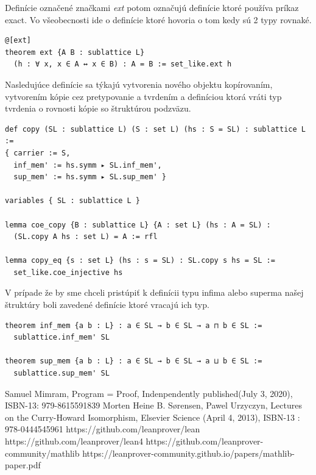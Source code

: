 \documentclass[a4paper,10pt,oneside]{report}%
\begin{document}
    Definície označené značkami \emph{ext} potom označujú definície ktoré
používa príkaz exact. Vo všeobecnosti ide o definície ktoré hovoria o tom
kedy sú 2 typy rovnaké.
\begin{lstlisting}
@[ext]
theorem ext {A B : sublattice L}
  (h : ∀ x, x ∈ A ↔ x ∈ B) : A = B := set_like.ext h
\end{lstlisting}
    Nasledujúce definície sa týkajú vytvorenia nového objektu kopírovaním,
vytvorením kópie cez pretypovanie a tvrdením a definíciou ktorá vráti typ
tvrdenia o rovnosti kópie so štruktúrou podzväzu.
\begin{lstlisting}
def copy (SL : sublattice L) (S : set L) (hs : S = SL) : sublattice L :=
{ carrier := S,
  inf_mem' := hs.symm ▸ SL.inf_mem',
  sup_mem' := hs.symm ▸ SL.sup_mem' }

variables { SL : sublattice L }

lemma coe_copy {B : sublattice L} {A : set L} (hs : A = SL) :
  (SL.copy A hs : set L) = A := rfl

lemma copy_eq {s : set L} (hs : s = SL) : SL.copy s hs = SL :=
  set_like.coe_injective hs
\end{lstlisting}
    V prípade že by sme chceli pristúpiť k definícii typu infima alebo superma
našej štruktúry boli zavedené definície ktoré vracajú ich typ.
\begin{lstlisting}
theorem inf_mem {a b : L} : a ∈ SL → b ∈ SL → a ⊓ b ∈ SL :=
  sublattice.inf_mem' SL

theorem sup_mem {a b : L} : a ∈ SL → b ∈ SL → a ⊔ b ∈ SL :=
  sublattice.sup_mem' SL
\end{lstlisting}


\begin{thebibliography}{xx}
     Samuel Mimram, Program = Proof, Indenpendently published(July 3, 2020), ISBN-13: 979-8615591839
     Morten Heine B. Sørensen, Pawel Urzyczyn, Lectures on the Curry-Howard Isomorphism,
        Elsevier Science (April 4, 2013),  ISBN-13 : 978-0444545961
     https://github.com/leanprover/lean
     https://github.com/leanprover/lean4
     https://github.com/leanprover-community/mathlib
     https://leanprover-community.github.io/papers/mathlib-paper.pdf
\end{thebibliography}
\end{document}
